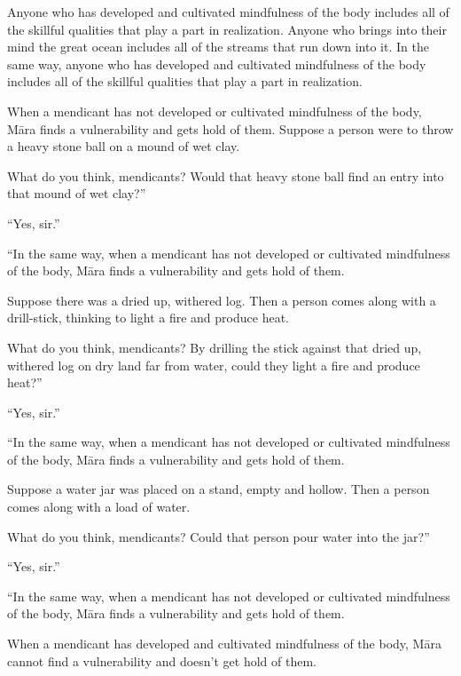 \documentclass[12pt,openany]{book}%
\begin{document}
Anyone who has developed and cultivated mindfulness of the body includes all of the skillful qualities that play a part in realization. Anyone who brings into their mind the great ocean includes all of the streams that run down into it. In the same way, anyone who has developed and cultivated mindfulness of the body includes all of the skillful qualities that play a part in realization. 

When a mendicant has not developed or cultivated mindfulness of the body, \textsanskrit{Māra} finds a vulnerability and gets hold of them. Suppose a person were to throw a heavy stone ball on a mound of wet clay. 

What do you think, mendicants? Would that heavy stone ball find an entry into that mound of wet clay?” 

“Yes, sir.” 

“In the same way, when a mendicant has not developed or cultivated mindfulness of the body, \textsanskrit{Māra} finds a vulnerability and gets hold of them. 

Suppose there was a dried up, withered log. Then a person comes along with a drill-stick, thinking to light a fire and produce heat. 

What do you think, mendicants? By drilling the stick against that dried up, withered log on dry land far from water, could they light a fire and produce heat?” 

“Yes, sir.” 

“In the same way, when a mendicant has not developed or cultivated mindfulness of the body, \textsanskrit{Māra} finds a vulnerability and gets hold of them. 

Suppose a water jar was placed on a stand, empty and hollow. Then a person comes along with a load of water. 

What do you think, mendicants? Could that person pour water into the jar?” 

“Yes, sir.” 

“In the same way, when a mendicant has not developed or cultivated mindfulness of the body, \textsanskrit{Māra} finds a vulnerability and gets hold of them. 

When a mendicant has developed and cultivated mindfulness of the body, \textsanskrit{Māra} cannot find a vulnerability and doesn’t get hold of them. 
\end{document}
